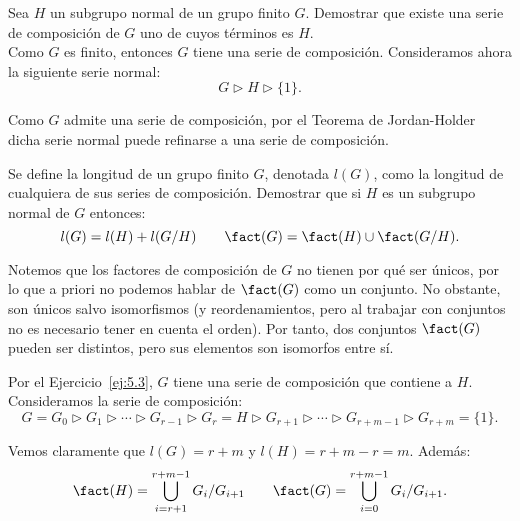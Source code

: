 \begin{ejercicio}\label{ej:5.3}
    Sea $H$ un subgrupo normal de un grupo finito $G$. Demostrar que existe una serie de composición de $G$ uno de cuyos términos es $H$.\\

    Como $G$ es finito, entonces $G$ tiene una serie de composición. Consideramos ahora la siguiente serie normal:
    \[
        G \rhd H \rhd \{1\}.
    \]

    Como $G$ admite una serie de composición, por el Teorema de Jordan-Holder dicha serie normal puede refinarse a una serie de composición.
\end{ejercicio}

\begin{ejercicio}\label{ej:5.4}
    Se define la longitud de un grupo finito $G$, denotada $l(G)$, como la longitud de cualquiera de sus series de composición. Demostrar que si $H$ es un subgrupo normal de $G$ entonces:
    \begin{equation*}
        l(G) = l(H) + l(G/H)\qquad \fact(G)=\fact(H)\cup\fact(G/H).
    \end{equation*}
    \begin{observacion}
        Notemos que los factores de composición de $G$ no tienen por qué ser únicos, por lo que a priori no podemos hablar de $\fact(G)$ como un conjunto. No obstante, son únicos salvo isomorfismos (y reordenamientos, pero al trabajar con conjuntos no es necesario tener en cuenta el orden). Por tanto, dos conjuntos $\fact(G)$ pueden ser distintos, pero sus elementos son isomorfos entre sí.
    \end{observacion}

    Por el Ejercicio~\ref{ej:5.3}, $G$ tiene una serie de composición que contiene a $H$. Consideramos la serie de composición:
    \[
        G = G_0 \rhd G_1 \rhd \cdots \rhd G_{r-1} \rhd G_r = H \rhd G_{r+1} \rhd \cdots \rhd G_{r+m-1} \rhd G_{r+m} = \{1\}.
    \]

    Vemos claramente que $l(G)=r+m$ y $l(H)=r+m-r=m$. Además:
    \begin{equation*}
        \fact(H)=\bigcup_{i=r+1}^{r+m-1} G_i/G_{i+1} \qquad \fact(G)=\bigcup_{i=0}^{r+m-1} G_i/G_{i+1}.
    \end{equation*}    
    

\end{ejercicio}
